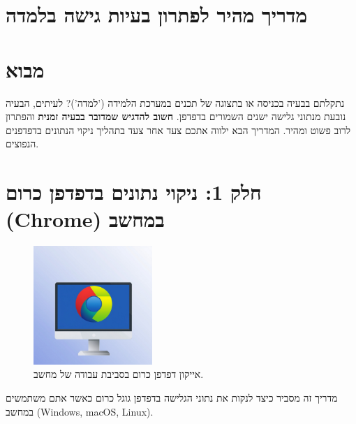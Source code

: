 \documentclass[12pt]{article}
\begin{document}
\section*{מדריך מהיר לפתרון בעיות גישה בלמדה}

\section*{מבוא}

נתקלתם בבעיה בכניסה או בתצוגה של תכנים במערכת הלמידה ('למדה')? לעיתים, הבעיה נובעת מנתוני גלישה ישנים השמורים בדפדפן. \textbf{חשוב להדגיש שמדובר בבעיה זמנית} והפתרון לרוב פשוט ומהיר. המדריך הבא ילווה אתכם צעד אחר צעד בתהליך ניקוי הנתונים בדפדפנים הנפוצים.

\section*{חלק 1: ניקוי נתונים בדפדפן כרום (Chrome) במחשב}

\begin{figure}[H]
  \centering
  \includegraphics[width=0.4\textwidth]{files/chrome_pc_icon.png}
  \caption{אייקון דפדפן כרום בסביבת עבודה של מחשב.}
\end{figure}

מדריך זה מסביר כיצד לנקות את נתוני הגלישה בדפדפן גוגל כרום כאשר אתם משתמשים במחשב (Windows, macOS, Linux).
\end{document}
